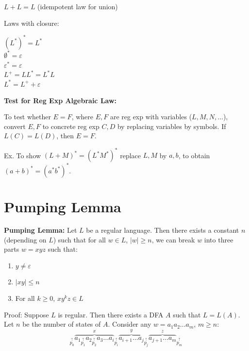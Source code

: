 \begin{frame}
$L+L=L$ (idempotent law for union) \\

\bigskip

Laws with closure:

$(L^*)^*=L^*$ \\
$\emptyset^*=\varepsilon$ \\
$\varepsilon^*=\varepsilon$ \\
$L^+=LL^*=L^*L$ \\
$L^*=L^++\varepsilon$

{\bf Test for Reg Exp Algebraic Law:}

To test whether $E=F$, where $E,F$ are reg exp with variables
($L,M,N,\ldots$), convert $E,F$ to concrete reg exp $C,D$ by
replacing variables by symbols.  If $L(C)=L(D)$, then $E=F$.

Ex. To show $(L+M)^*=(L^*M^*)^*$ replace $L,M$ by $a,b$, to obtain
$(a+b)^*=(a^*b^*)^*$.
\end{frame}

\section{Pumping Lemma}

\begin{frame}

{\bf Pumping Lemma:}  Let $L$ be a regular language.  Then there
exists a constant $n$ (depending on $L$) such that for all $w\in L$,
$|w|\geq n$, we can break $w$ into three parts $w=xyz$ such that:
\begin{enumerate}
\item  $y\neq\varepsilon$
\item  $|xy|\le n$
\item  For all $k\geq 0$, $xy^kz\in L$
\end{enumerate}

Proof:  Suppose $L$ is regular.  Then there exists a DFA $A$ such that
$L=L(A)$.  Let $n$ be the number of states of $A$.   Consider any
$w=a_1a_2\ldots a_m$, $m\geq n$:
$$
{}_{\displaystyle\stackrel{\uparrow}{p_0}}\overbrace{a_1
{}_{\displaystyle\stackrel{\uparrow}{p_1}}a_2
{}_{\displaystyle\stackrel{\uparrow}{p_2}}a_3
\ldots
a_i}^{x}
{}_{\displaystyle\stackrel{\uparrow}{p_i}}\overbrace{a_{i+1}
\ldots
a_j}^{y}
{}_{\displaystyle\stackrel{\uparrow}{p_j}}\overbrace{a_{j+1}
\ldots
a_m}^{z}{}_{\displaystyle\stackrel{\uparrow}{p_{m}}}
$$
\end{frame}

